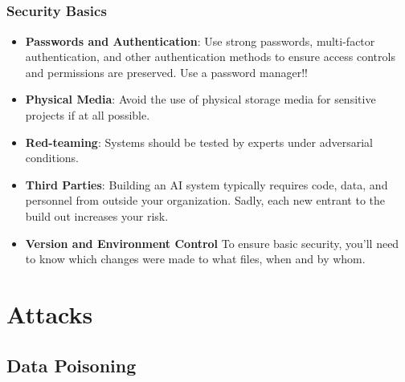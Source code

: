 \documentclass[11pt,
               aspectratio=169,
               hyperref={colorlinks}
               ]{beamer}
\begin{document}
	\subsection*{}
	\begin{frame}
	
	\frametitle{Security Basics}
	
	\begin{itemize}			
			\item \textbf{Passwords and Authentication}: Use strong passwords, multi-factor authentication, and other authentication methods to ensure access controls and permissions are preserved. Use a password manager!!
			\item \textbf{Physical Media}: Avoid the use of physical storage media for sensitive projects if at all possible. 
			\item \textbf{Red-teaming}: Systems should be tested by experts under adversarial conditions.
			\item \textbf{Third Parties}: Building an AI system typically requires code, data, and personnel from outside your organization. Sadly, each new entrant to the build out increases your risk. 
			\item \textbf{Version and Environment Control} To ensure basic security, you'll need to know which changes were made to what files, when and by whom.
		\end{itemize}
		
	\end{frame}
	\section{Attacks}

		\subsection{Data Poisoning}
\end{document}

